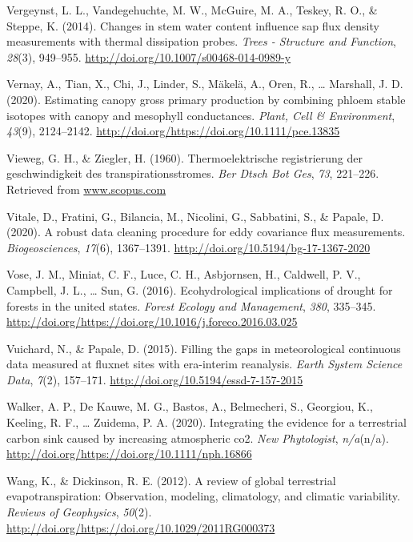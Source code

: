 \documentclass[11pt,twoside]{reedthesis}
\begin{document}
\hypertarget{ref-Vergeynst2014}{}
Vergeynst, L. L., Vandegehuchte, M. W., McGuire, M. A., Teskey, R. O.,
\& Steppe, K. (2014). Changes in stem water content influence sap flux
density measurements with thermal dissipation probes. \emph{Trees -
Structure and Function}, \emph{28}(3), 949--955.
\url{http://doi.org/10.1007/s00468-014-0989-y}

\hypertarget{ref-Vernay2020}{}
Vernay, A., Tian, X., Chi, J., Linder, S., Mäkelä, A., Oren, R.,
\ldots{} Marshall, J. D. (2020). Estimating canopy gross primary
production by combining phloem stable isotopes with canopy and mesophyll
conductances. \emph{Plant, Cell \& Environment}, \emph{43}(9),
2124--2142. \url{http://doi.org/https://doi.org/10.1111/pce.13835}

\hypertarget{ref-Vieweg1960}{}
Vieweg, G. H., \& Ziegler, H. (1960). Thermoelektrische registrierung
der geschwindigkeit des transpirationsstromes. \emph{Ber Dtsch Bot Ges},
\emph{73}, 221--226. Retrieved from \url{www.scopus.com}

\hypertarget{ref-Vitale2020}{}
Vitale, D., Fratini, G., Bilancia, M., Nicolini, G., Sabbatini, S., \&
Papale, D. (2020). A robust data cleaning procedure for eddy covariance
flux measurements. \emph{Biogeosciences}, \emph{17}(6), 1367--1391.
\url{http://doi.org/10.5194/bg-17-1367-2020}

\hypertarget{ref-Vose2016}{}
Vose, J. M., Miniat, C. F., Luce, C. H., Asbjornsen, H., Caldwell, P.
V., Campbell, J. L., \ldots{} Sun, G. (2016). Ecohydrological
implications of drought for forests in the united states. \emph{Forest
Ecology and Management}, \emph{380}, 335--345.
\url{http://doi.org/https://doi.org/10.1016/j.foreco.2016.03.025}

\hypertarget{ref-Vuichard2015}{}
Vuichard, N., \& Papale, D. (2015). Filling the gaps in meteorological
continuous data measured at fluxnet sites with era-interim reanalysis.
\emph{Earth System Science Data}, \emph{7}(2), 157--171.
\url{http://doi.org/10.5194/essd-7-157-2015}

\hypertarget{ref-Walker2020}{}
Walker, A. P., De Kauwe, M. G., Bastos, A., Belmecheri, S., Georgiou,
K., Keeling, R. F., \ldots{} Zuidema, P. A. (2020). Integrating the
evidence for a terrestrial carbon sink caused by increasing atmospheric
co2. \emph{New Phytologist}, \emph{n/a}(n/a).
\url{http://doi.org/https://doi.org/10.1111/nph.16866}

\hypertarget{ref-WangDickinson2012}{}
Wang, K., \& Dickinson, R. E. (2012). A review of global terrestrial
evapotranspiration: Observation, modeling, climatology, and climatic
variability. \emph{Reviews of Geophysics}, \emph{50}(2).
\url{http://doi.org/https://doi.org/10.1029/2011RG000373}
\end{document}
